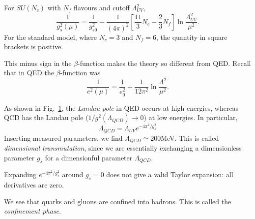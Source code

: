 For $SU(N_c)$ with $N_f$ flavours and cutoff $\Lambda^2_{UV}$, 
\begin{equation}
  \frac{1}{g^2_s(\mu)} = \frac{1}{g^2_{s 0}} - \frac{1}{(4 \pi)^2} \left[ \frac{11}{3} N_c - \frac{2}{3} N_f \right] \ln \frac{\Lambda^2_{UV}}{\mu^2}.
\end{equation}
For the standard model, where $N_c = 3$ and $N_f = 6$, the quantity in square brackets is positive.

This minus sign in the $\beta$-function makes the theory so different from QED.
Recall that in QED the $\beta$-function was
\begin{equation}
  \frac{1}{e^2(\mu)} = \frac{1}{e^2_0} + \frac{1}{12 \pi^2} \ln \frac{\Lambda^2}{\mu^2}.
\end{equation}

\begin{figure}[tbhp]
  \centering
  \caption{}
  \label{fig:l22f1}
\end{figure}
As shown in Fig.~\ref{fig:l22f1}, the \emph{Landau pole} in QED occurs at high energies, whereas QCD has the Landau pole ($1 / g^2 (\Lambda_{QCD}) \to 0$) at low energies.
In particular, 
\begin{equation}
  \boxed{\Lambda_{QCD} = \Lambda_{UV} e^{-4 \pi^2 / g_s^2}}
\end{equation}
Inserting measured parameters, we find $\Lambda_{QCD} \simeq 200$MeV.
This is called \emph{dimensional transmutation}, since we are essentially exchanging a dimensionless parameter $g_s$ for a dimensionful parameter $\Lambda_{QCD}$.
\begin{remark}
  Expanding $e^{-4 \pi ^2 / g^2_s}$ around $g_s = 0$ does not give a valid Taylor expansion: all derivatives are zero.
\end{remark}

We see that quarks and gluons are confined into hadrons. This is called the \emph{confinement phase}.
